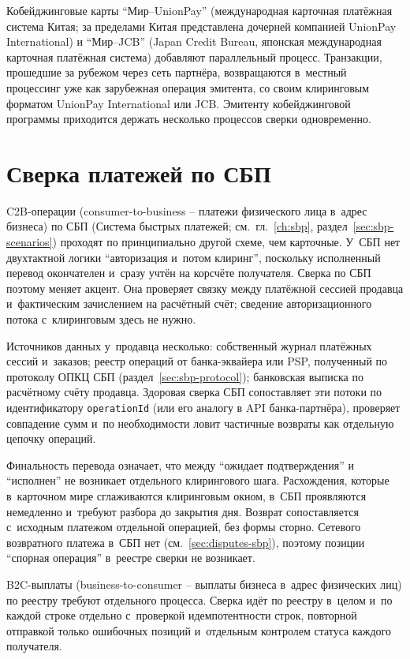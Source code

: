 Кобейджинговые карты \enquote{Мир--UnionPay} (международная карточная
платёжная система Китая; за пределами Китая представлена дочерней
компанией UnionPay International) и \enquote{Мир--JCB} (Japan Credit
Bureau, японская международная карточная платёжная система) добавляют
параллельный процесс. Транзакции, прошедшие за рубежом
через сеть партнёра, возвращаются в~местный процессинг уже как
зарубежная операция эмитента, со своим клиринговым форматом
UnionPay International или JCB. Эмитенту кобейджинговой программы
приходится держать несколько процессов сверки одновременно.

\section{Сверка платежей по СБП}\label{sec:recon-sbp}

C2B-операции (consumer-to-business -- платежи физического лица в~адрес
бизнеса) по СБП (Система быстрых платежей; см.~гл.~\ref{ch:sbp},
раздел~\ref{sec:sbp-scenarios}) проходят по принципиально другой
схеме, чем карточные. У~СБП нет двухтактной логики \enquote{авторизация
и~потом клиринг}, поскольку исполненный перевод окончателен и~сразу
учтён на корсчёте получателя.
Сверка по СБП поэтому меняет акцент. Она проверяет связку
между платёжной сессией продавца и~фактическим зачислением
на расчётный счёт; сведение авторизационного потока с~клиринговым
здесь не нужно.

Источников данных у~продавца несколько: собственный журнал платёжных
сессий и~заказов; реестр операций от банка-эквайера или PSP,
полученный по протоколу ОПКЦ СБП (раздел~\ref{sec:sbp-protocol});
банковская выписка по расчётному счёту продавца. Здоровая
сверка СБП сопоставляет эти потоки по идентификатору
\texttt{operationId} (или его аналогу в API банка-партнёра),
проверяет совпадение сумм и~по необходимости ловит частичные
возвраты как отдельную цепочку операций.

Финальность перевода означает, что между \enquote{ожидает подтверждения} и \enquote{исполнен} не возникает отдельного клирингового шага. Расхождения, которые
в~карточном мире сглаживаются клиринговым окном, в~СБП проявляются
немедленно и~требуют разбора до закрытия дня. Возврат сопоставляется
с~исходным платежом отдельной операцией, без формы сторно. Сетевого
возвратного платежа в~СБП нет (см.~\ref{sec:disputes-sbp}), поэтому
позиции \enquote{спорная операция} в~реестре сверки не возникает.

B2C-выплаты (business-to-consumer -- выплаты бизнеса в~адрес
физических лиц) по реестру требуют отдельного процесса. Сверка
идёт по реестру в~целом и~по каждой строке отдельно с~проверкой
идемпотентности строк, повторной отправкой только ошибочных
позиций и~отдельным контролем статуса каждого получателя.

